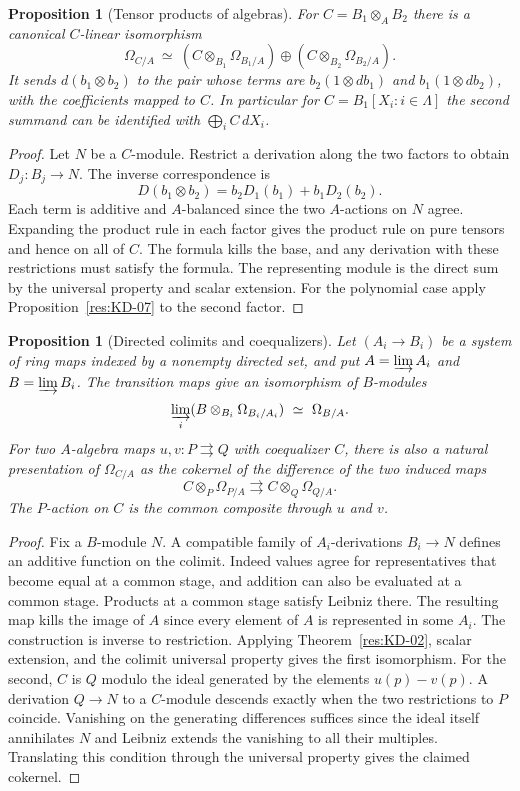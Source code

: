 \documentclass[11pt,oneside,openany]{book}
\newtheorem{proposition}[theorem]{Proposition}
\theoremstyle{definition}
\theoremstyle{remark}
\begin{document}
\begin{proposition}[Tensor products of algebras]\label{res:KD-18}
For $C=B_1\otimes_A B_2$ there is a canonical $C$-linear isomorphism
\[
 \Omega_{C/A}\ \simeq\
 (C\otimes_{B_1}\Omega_{B_1/A})\oplus
 (C\otimes_{B_2}\Omega_{B_2/A}).
\]
It sends $d(b_1\otimes b_2)$ to the pair whose terms are $b_2(1\otimes db_1)$ and $b_1(1\otimes db_2)$, with the coefficients mapped to $C$. In particular for $C=B_1[X_i:i\in\Lambda]$ the second summand can be identified with $\bigoplus_i C\,dX_i$.
\end{proposition}

\begin{proof}
Let $N$ be a $C$-module. Restrict a derivation along the two factors to obtain $D_j:B_j\to N$. The inverse correspondence is
\[
 D(b_1\otimes b_2)=b_2D_1(b_1)+b_1D_2(b_2).
\]
Each term is additive and $A$-balanced since the two $A$-actions on $N$ agree. Expanding the product rule in each factor gives the product rule on pure tensors and hence on all of $C$. The formula kills the base, and any derivation with these restrictions must satisfy the formula. The representing module is the direct sum by the universal property and scalar extension. For the polynomial case apply Proposition~\ref{res:KD-07} to the second factor.
\end{proof}

\begin{proposition}[Directed colimits and coequalizers]\label{res:KD-19}
Let $(A_i\to B_i)$ be a system of ring maps indexed by a nonempty directed set, and put $A=\varinjlim A_i$ and $B=\varinjlim B_i$. The transition maps give an isomorphism of $B$-modules
\[
 \varinjlim_i (B\otimes_{B_i}\Omega_{B_i/A_i})\ \simeq\ \Omega_{B/A}.
\]
For two $A$-algebra maps $u,v:P\rightrightarrows Q$ with coequalizer $C$, there is also a natural presentation of $\Omega_{C/A}$ as the cokernel of the difference of the two induced maps
\[
 C\otimes_P\Omega_{P/A}\rightrightarrows C\otimes_Q\Omega_{Q/A}.
\]
The $P$-action on $C$ is the common composite through $u$ and $v$.
\end{proposition}

\begin{proof}
Fix a $B$-module $N$. A compatible family of $A_i$-derivations $B_i\to N$ defines an additive function on the colimit. Indeed values agree for representatives that become equal at a common stage, and addition can also be evaluated at a common stage. Products at a common stage satisfy Leibniz there. The resulting map kills the image of $A$ since every element of $A$ is represented in some $A_i$. The construction is inverse to restriction. Applying Theorem~\ref{res:KD-02}, scalar extension, and the colimit universal property gives the first isomorphism. For the second, $C$ is $Q$ modulo the ideal generated by the elements $u(p)-v(p)$. A derivation $Q\to N$ to a $C$-module descends exactly when the two restrictions to $P$ coincide. Vanishing on the generating differences suffices since the ideal itself annihilates $N$ and Leibniz extends the vanishing to all their multiples. Translating this condition through the universal property gives the claimed cokernel.
\end{proof}
\end{document}
